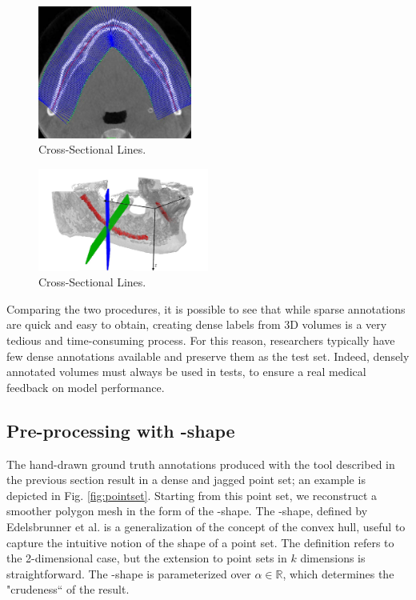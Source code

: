 \begin{figure}[!ht]
  \centering
  \includegraphics[width=0.45\textwidth]{Images/csl.jpg}
  \caption{Cross-Sectional Lines.}
  \label{fig:csl}
\end{figure}

\begin{figure}[!ht]
  \centering
  \includegraphics[width=0.5\textwidth]{Images/csl-orthogonal.jpg}
  \caption{Cross-Sectional Lines.}
  \label{fig:csl-orthogonal}
\end{figure}

Comparing the two procedures, it is possible to see that while sparse
annotations are quick and easy to obtain, creating dense labels from 3D volumes
is a very tedious and time-consuming process. For this reason, researchers
typically have few dense annotations available and preserve them as the test
set. Indeed, densely annotated volumes must always be used in tests, to ensure a
real medical feedback on model performance.

\subsection{Pre-processing with \textalpha-shape}
\label{sec:alpha}
The hand-drawn ground truth annotations produced with the tool described in the
previous section result in a dense and jagged point set; an example is depicted
in Fig. \ref{fig:pointset}. Starting from this point set, we reconstruct a
smoother polygon mesh in the form of the \textalpha-shape. The \textalpha-shape,
defined by Edelsbrunner et al. is a generalization of the concept of the convex
hull, useful to capture the intuitive notion of the shape of a point set. The
definition refers to the 2-dimensional case, but the extension to point sets in
$k$ dimensions is straightforward. The \textalpha-shape is parameterized over
$\alpha \in \mathbb{R}$, which determines the "crudeness`` of the result.\\

